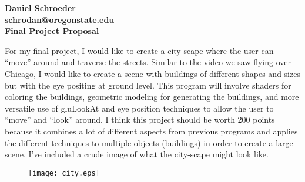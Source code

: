\documentclass[10pt, draftclsnofoot, onecolumn]{IEEEtran}
\begin{document}
\begin{titlepage}
        \textbf{Daniel Schroeder}\\
        \textbf{schrodan@oregonstate.edu}\\
        \textbf{Final Project Proposal}\\
        \vspace{1.5cm}
        
        For my final project, I would like to create a city-scape where the user can ``move'' around and traverse the streets. Similar to the video we saw flying over Chicago, I would like to create a scene with buildings of different shapes and sizes but with the eye positing at ground level. This program will involve shaders for coloring the buildings, geometric modeling for generating the buildings, and more versatile use of gluLookAt and eye position techniques to allow the user to ``move'' and ``look'' around.
        I think this project should be worth 200 points because it combines a lot of different aspects from previous programs and applies the different techniques to multiple objects (buildings) in order to create a large scene. I've included a crude image of what the city-scape might look like.

        \vspace{1.5cm}
        \begin{center} 
		\begin{figure}[H]
            \centering
            \texttt{[image: city.eps]}
        \end{figure}

    \end{center}
\end{titlepage}
\end{document}
